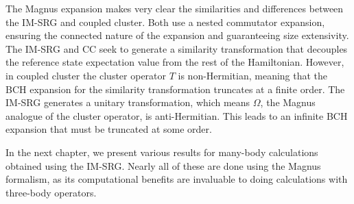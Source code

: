 The Magnus expansion makes very clear the similarities and differences between
the IM-SRG and coupled cluster.
Both use a nested commutator expansion,
ensuring the connected nature of the expansion
and guaranteeing size extensivity.
The IM-SRG and CC seek to generate a similarity transformation
that decouples the reference state expectation value from the rest of the Hamiltonian.
However, in coupled cluster the cluster operator $T$ is non-Hermitian,
meaning that the BCH expansion for the similarity transformation truncates at a finite order.
The IM-SRG generates a unitary transformation,
which means $\Omega$, the Magnus analogue of the cluster operator,
is anti-Hermitian.
This leads to an infinite BCH expansion that must be truncated at some order.

In the next chapter, we present various results
for many-body calculations obtained using the IM-SRG.\@
Nearly all of these are done using the Magnus formalism,
as its computational benefits are invaluable to doing calculations
with three-body operators.

